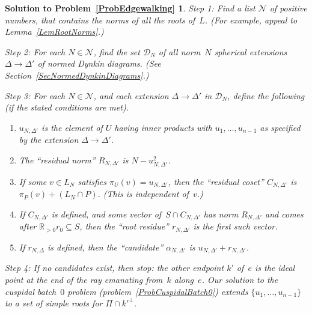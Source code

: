 \documentclass[12pt]{amsart}
\def\calD{\mathcal{D}}
\def\calN{\mathcal{N}}
\def\R{\mathbb{R}}
\def\sset{\subseteq}
\def\D{\Delta}
\numberwithin{theorem}{section}
\numberwithin{equation}{section}
\numberwithin{figure}{section}
\newtheorem*{SolutionToEdgewalking}{Solution to Problem~\ref{ProbEdgewalking}}
\theoremstyle{remark}
\begin{document}
\begin{SolutionToEdgewalking}
    \leavevmode\nopagebreak

    Step 1: Find a list $\calN$ of positive numbers,  that contains the
    norms of all the roots of~$L$. (For example, appeal to Lemma~\ref{LemRootNorms}.)

    \smallskip
    Step 2: For each $N\in\calN$, find the set $\calD_N$ of all norm~$N$
    spherical extensions $\D\to\D'$ of normed Dynkin diagrams.  (See Section~\ref{SecNormedDynkinDiagrams}.)

    \smallskip
    Step 3: For each $N\in\calN$, and each extension $\D\to\D'$ in $\calD_N$,
    define the following (if
    the stated conditions are met).
    \begin{enumerate}
        \item
            \label{DefinitionsEdgewalkingu}
 $u_{N,\D'}$ is the element of $U$ having inner products
            with $u_1,\dots,u_{n-1}$ as specified by the extension $\D\to\D'$.  
    \item
        \label{DefinitionsEdgewalkingResidualNorm}
     The ``residual norm'' $R_{N,\D'}$ is $N-u_{N,\D'}^2$. 
\item
    \label{DefinitionsEdgewalkingResidualCoset}
    If 
            some $v\in L_N$ satisfies $\pi_U(v)=u_{N,\D'}$, then the ``residual coset''
            $C_{N,\D'}$ is $\pi_P(v)+(L_N\cap P)$. (This is independent of~$v$.)
\item
    \label{DefinitionsEdgewalkingRootResidue}
    If $C_{N,\D'}$ is defined, 
            and some vector of~$S\cap C_{N,\D'}$ has norm $R_{N,\D'}$ and 
            comes after $\R_{>0}r_0\sset S$,
            then the ``root residue'' 
            $r_{N,\D'}$ is the first such vector.
        \item
            \label{DefinitionsEdgewalkingCandidate}
            If $r_{N,\D}$ is defined, then the ``candidate''
            $\alpha_{N,\D'}$ is $u_{N,\D'}+r_{N,\D'}$.
    \end{enumerate}

    \smallskip
    Step 4: If no candidates exist, then
    stop:
    the other endpoint $k'$ of~$e$
    is the ideal point at the end of the ray emanating from~$k$ along~$e$.
    Our solution to the cuspidal batch~$0$ problem (problem~\ref{ProbCuspidalBatch0}) 
    extends $\{u_1,\dots,u_{n-1}\}$ 
    to a set of simple roots for $\Pi\cap k'^\perp$.


\end{SolutionToEdgewalking}
\end{document}
